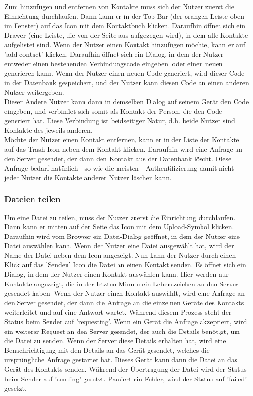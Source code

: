 \documentclass[a4paper]{article}
\begin{document}
Zum hinzufügen und entfernen von Kontakte muss sich der Nutzer zuerst die
Einrichtung durchlaufen. Dann kann er in der Top-Bar (der orangen Leiste oben im
Fenster) auf das Icon mit dem Kontaktbuch klicken. Daraufhin öffnet sich ein
Drawer (eine Leiste, die von der Seite aus aufgezogen wird), in dem alle
Kontakte aufgelistet sind. Wenn der Nutzer einen Kontakt hinzufügen möchte, kann
er auf 'add contact' klicken. Daraufhin öffnet sich ein Dialog, in dem der
Nutzer entweder einen bestehenden Verbindungscode eingeben, oder einen neuen
generieren kann. Wenn der Nutzer einen neuen Code generiert, wird dieser Code in
der Datenbank gespeichert, und der Nutzer kann diesen Code an einen anderen
Nutzer weitergeben.\\
Dieser Andere Nutzer kann dann in demselben Dialog auf seinem Gerät den Code
eingeben, und verbindet sich somit als Kontakt der Person, die den Code
generiert hat. Diese Verbindung ist beidseitiger Natur, d.h. beide Nutzer sind
Kontakte des jeweils anderen.\\
Möchte der Nutzer einen Kontakt entfernen, kann er in der Liste der Kontakte auf
das Trash-Icon neben dem Kontakt klicken. Daraufhin wird eine Anfrage an den
Server gesendet, der dann den Kontakt aus der Datenbank löscht. Diese Anfrage
bedarf natürlich - so wie die meisten - Authentifizierung damit nicht jeder
Nutzer die Kontakte anderer Nutzer löschen kann.



\subsubsection{Dateien teilen}

Um eine Datei zu teilen, muss der Nutzer zuerst die Einrichtung durchlaufen.
Dann kann er mitten auf der Seite das Icon mit dem Upload-Symbol klicken.
Daraufhin wird vom Browser ein Datei-Dialog geöffnet, in dem der Nutzer eine
Datei auswählen kann. Wenn der Nutzer eine Datei ausgewählt hat, wird der Name
der Datei neben dem Icon angezeigt. Nun kann der Nutzer durch einen Klick auf
das 'Senden' Icon die Datei an einen Kontakt senden. Es öffnet sich ein Dialog,
in dem der Nutzer einen Kontakt auswählen kann. Hier werden nur Kontakte
angezeigt, die in der letzten Minute ein Lebenszeichen an den Server gesendet
haben. Wenn der Nutzer einen Kontakt auswählt, wird eine Anfrage an den Server
gesendet, der dann die Anfrage an die einzelnen Geräte des Kontakts weiterleitet
und auf eine Antwort wartet. Während diesem Prozess steht der Status beim Sender
auf 'requesting'. Wenn ein Gerät die Anfrage akzeptiert, wird ein weiterer
Request an den Server gesendet, der auch die Details benötigt, um die Datei zu
senden. Wenn der Server diese Details erhalten hat, wird eine Benachrichtigung
mit den Details an das Gerät gesendet, welches die ursprüngliche Anfrage
gestartet hat. Dieses Gerät kann dann die Datei an das Gerät des Kontakts
senden. Während der Übertragung der Datei wird der Status beim Sender auf
'sending' gesetzt. Passiert ein Fehler, wird der Status auf 'failed' gesetzt.
\end{document}
